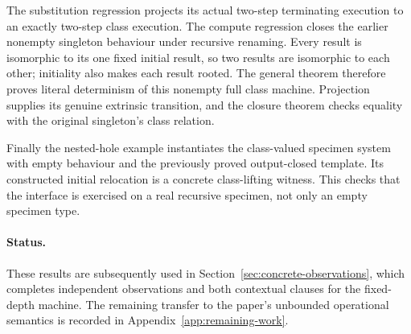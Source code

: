 
The substitution regression projects its actual two-step terminating execution
to an exactly two-step class execution. The compute regression closes the earlier
nonempty singleton behaviour under recursive renaming. Every result is isomorphic
to its one fixed initial result, so two results are isomorphic to each other;
initiality also makes each result rooted. The general theorem therefore proves
literal determinism of this nonempty full class machine. Projection supplies
its genuine extrinsic transition, and the closure theorem checks equality with
the original singleton's class relation.








Finally the nested-hole example instantiates the class-valued specimen system
with empty behaviour and the previously proved output-closed template. Its
constructed initial relocation is a concrete class-lifting witness. This checks
that the interface is exercised on a real recursive specimen, not only an empty
specimen type.



\paragraph{Status.}
These results are subsequently used in Section~\ref{sec:concrete-observations},
which completes independent observations and both contextual clauses for
the fixed-depth machine. The remaining transfer to the paper's unbounded
operational semantics is recorded in Appendix~\ref{app:remaining-work}.
